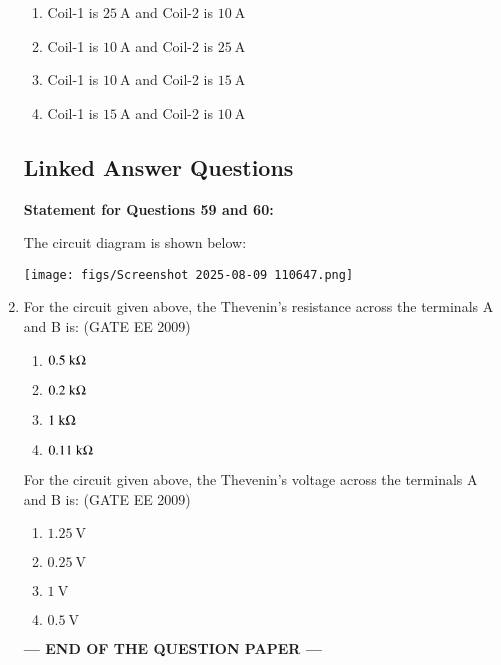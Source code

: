 \documentclass[journal,12pt,onecolumn]{IEEEtran}
\theoremstyle{remark}
\begin{document}
\begin{flushleft}
\begin{enumerate}
\begin{enumerate}
\item  Coil-1 is \(25 \ \mathrm{A}\) and Coil-2 is \(10 \ \mathrm{A}\) 
\item  Coil-1 is \(10 \ \mathrm{A}\) and Coil-2 is \(25 \ \mathrm{A}\) 
\item  Coil-1 is \(10 \ \mathrm{A}\) and Coil-2 is \(15 \ \mathrm{A}\) 
\item Coil-1 is \(15 \ \mathrm{A}\) and Coil-2 is \(10 \ \mathrm{A}\)
\end{enumerate}

 
\subsection*{Linked Answer Questions}

\textbf{Statement for Questions 59 and 60:}

The circuit diagram is shown below:

\begin{center}
\texttt{[image: figs/Screenshot 2025-08-09 110647.png]}
\label{fig:placeholder}
\end{center}

\item For the circuit given above, the Thevenin's resistance across the terminals A and B is:
\hfill(GATE EE 2009)
\begin{enumerate}
    

\item \(0.5 \ \mathrm{k\ohm}\) 
\item  \(0.2 \ \mathrm{k\ohm}\) 
\item  \(1 \ \mathrm{k\ohm}\) 
\item  \(0.11 \ \mathrm{k\ohm}\)
\end{enumerate} 

For the circuit given above, the Thevenin's voltage across the terminals A and B is:
\hfill(GATE EE 2009)
\begin{enumerate}
    

\item  \(1.25 \ \mathrm{V}\) 
\item  \(0.25 \ \mathrm{V}\) 
\item  \(1 \ \mathrm{V}\) 
\item  \(0.5 \ \mathrm{V}\)
\end{enumerate}


\begin{center}
\textbf{--- END OF THE QUESTION PAPER ---}
\end{center}

\end{enumerate}
\end{flushleft}
\end{document}
